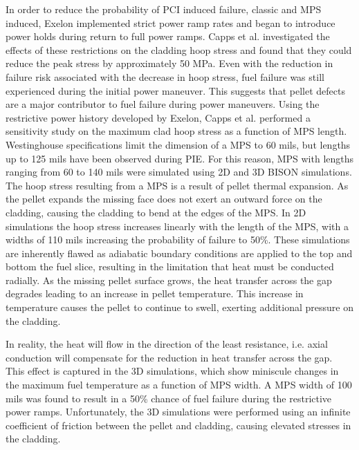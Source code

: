 \documentclass[edeposit,fullpage,12pt]{uiucthesis2009}
\begin{document}
In order to reduce the probability of \gls{PCI} induced failure, classic and \gls{MPS} induced, Exelon implemented strict power ramp rates and began to introduce power holds during return to full power ramps.%
Capps et al. investigated the effects of these restrictions on the cladding hoop stress and found that they could reduce the peak stress by approximately 50 MPa.
Even with the reduction in failure risk associated with the decrease in hoop stress, fuel failure was still experienced during the initial power maneuver.
This suggests that pellet defects are a major contributor to fuel failure during power maneuvers. 
Using the restrictive power history developed by Exelon, Capps et al. performed a sensitivity study on the maximum clad hoop stress as a function of \gls{MPS} length.
Westinghouse specifications limit the dimension of a \gls{MPS} to 60 mils, but lengths up to 125 mils have been observed during \gls{PIE}.
For this reason, \gls{MPS} with lengths ranging from 60 to 140 mils were simulated using 2D and 3D BISON simulations. 
The hoop stress resulting from a \gls{MPS} is a result of pellet thermal expansion. 
As the pellet expands the missing face does not exert an outward force on the cladding, causing the cladding to bend at the edges of the \gls{MPS}.
In 2D simulations the hoop stress increases linearly with the length of the \gls{MPS}, with a widths of 110 mils increasing the probability of failure to 50\%.
These simulations are inherently flawed as adiabatic boundary conditions are applied to the top and bottom the fuel slice, resulting in the limitation that heat must be conducted radially.
As the missing pellet surface grows, the heat transfer across the gap degrades leading to an increase in pellet temperature.
This increase in temperature causes the pellet to continue to swell, exerting additional pressure on the cladding.

In reality, the heat will flow in the direction of the least resistance, i.e. axial conduction will compensate for the reduction in heat transfer across the gap.
This effect is captured in the 3D simulations, which show miniscule changes in the maximum fuel temperature as a function of \gls{MPS} width.
A \gls{MPS} width of 100 mils was found to result in a 50\% chance of fuel failure during the restrictive power ramps.
Unfortunately, the 3D simulations were performed using an infinite coefficient of friction between the pellet and cladding, causing elevated stresses in the cladding.
\end{document}
